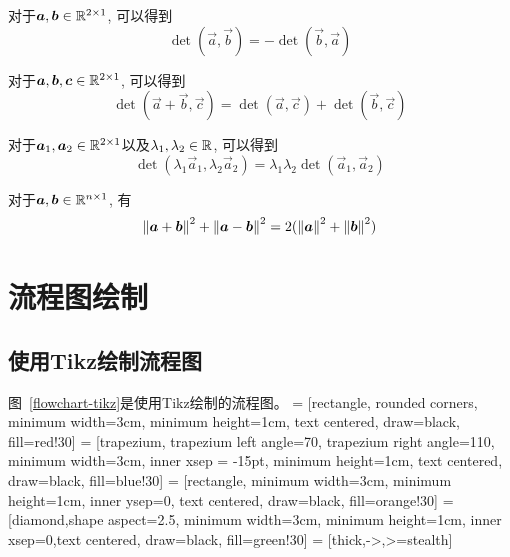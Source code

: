 \begin{property}[反对称性]
对于$\bm{a},\bm{b}\in \mathbb{R}^{{2}\times {1}}$, 可以得到
$$
\det(\vec{a},\vec{b}) = - \det(\vec{b},\vec{a})
$$
\end{property}

\begin{property}[可加性]
对于$\bm{a},\bm{b},\bm{c}\in \mathbb{R}^{{2}\times {1}}$, 可以得到
$$
\det(\vec{a}+\vec{b},\vec{c}) = \det(\vec{a},\vec{c}) +\det(\vec{b},\vec{c})
$$
\end{property}

\begin{property}[多重线性]
对于$\bm{a}_1,\bm{a}_2\in \mathbb{R}^{{2}\times {1}}$以及$\lambda_1, \lambda_2\in\mathbb{R}$, 可以得到
$$
\det(\lambda_1\vec{a}_1,\lambda_2\vec{a}_2) = \lambda_1\lambda_2 \det(\vec{a}_1,\vec{a}_2)
$$
\end{property}


\begin{corollary}
对于$\bm{a},\bm{b}\in \mathbb{R}^{{n}\times {1}}$, 有
$$
\left\lVert \bm{a}+\bm{b} \right\rVert^2 + \left\lVert \bm{a}-\bm{b} \right\rVert^2 =2(\left\lVert \bm{a} \right\rVert^2 +\left\lVert \bm{b} \right\rVert^2)
$$
\end{corollary}



\section{流程图绘制}
\subsection{使用Tikz绘制流程图}
图~\ref{flowchart-tikz}是使用Tikz绘制的流程图。
\usetikzlibrary{shapes.geometric,arrows}
\usetikzlibrary{fit}
\usetikzlibrary{backgrounds}
 = [rectangle, rounded corners, minimum width=3cm, minimum height=1cm, text centered, draw=black, fill=red!30]
        = [trapezium, trapezium left angle=70, trapezium right angle=110, minimum width=3cm, inner xsep = -15pt, minimum height=1cm, text centered, draw=black, fill=blue!30]
   = [rectangle, minimum width=3cm, minimum height=1cm, inner ysep=0, text centered, draw=black, fill=orange!30]
  = [diamond,shape aspect=2.5, minimum width=3cm, minimum height=1cm, inner xsep=0,text centered, draw=black, fill=green!30]
     = [thick,->,>=stealth]


